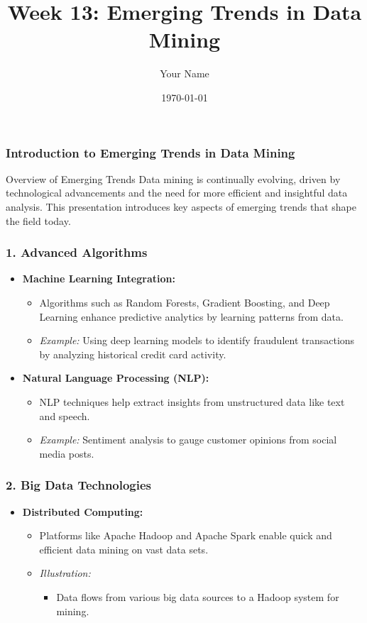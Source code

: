 \documentclass{beamer}
\title{Week 13: Emerging Trends in Data Mining}
\author{Your Name}
\institute{Your Institution}
\date{\today}
\begin{document}
\frame{\titlepage}

\begin{frame}[fragile]
    \frametitle{Introduction to Emerging Trends in Data Mining}
    \begin{block}{Overview of Emerging Trends}
        Data mining is continually evolving, driven by technological advancements and the need for more efficient and insightful data analysis. This presentation introduces key aspects of emerging trends that shape the field today.
    \end{block}
\end{frame}

\begin{frame}[fragile]
    \frametitle{1. Advanced Algorithms}
    \begin{itemize}
        \item \textbf{Machine Learning Integration:} 
        \begin{itemize}
            \item Algorithms such as Random Forests, Gradient Boosting, and Deep Learning enhance predictive analytics by learning patterns from data.
            \item \textit{Example:} Using deep learning models to identify fraudulent transactions by analyzing historical credit card activity.
        \end{itemize}
        
        \item \textbf{Natural Language Processing (NLP):} 
        \begin{itemize}
            \item NLP techniques help extract insights from unstructured data like text and speech.
            \item \textit{Example:} Sentiment analysis to gauge customer opinions from social media posts.
        \end{itemize}
    \end{itemize}
\end{frame}

\begin{frame}[fragile]
    \frametitle{2. Big Data Technologies}
    \begin{itemize}
        \item \textbf{Distributed Computing:} 
        \begin{itemize}
            \item Platforms like Apache Hadoop and Apache Spark enable quick and efficient data mining on vast data sets.
            \item \textit{Illustration:} 
            \begin{itemize}
                \item Data flows from various big data sources to a Hadoop system for mining.
            \end{itemize}
        \end{itemize}
    \end{itemize}
\end{frame}
\end{document}
